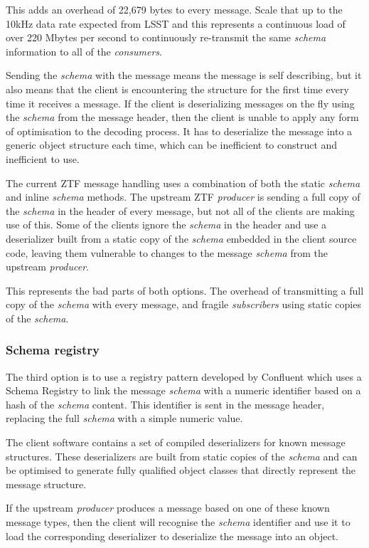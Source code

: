 \documentclass{article}
\newcommand{\kfconsumers} {\textit{consumers}\xspace}
\newcommand{\kfproducer} {\textit{producer}\xspace}
\newcommand{\kfsubscribers} {\textit{subscribers}\xspace}
\newcommand{\confluent} {Confluent\xspace}
\newcommand{\avschema} {\textit{schema}\xspace}
\newcommand{\conschemareg} {registry\xspace}
\newcommand{\conschemaregistry} {Schema Registry\xspace}
\newcommand{\deserz}    {deserialize\xspace}
\newcommand{\deserzer}  {deserializer\xspace}
\newcommand{\deserzers} {deserializers\xspace}
\newcommand{\deserzing} {deserializing\xspace}
\begin{document}
This adds an overhead of 22,679 bytes to every message. Scale that up to the 10kHz data rate expected from LSST and this represents a continuous load of over 220 Mbytes per second to continuously re-transmit the same \avschema information to all of the \kfconsumers.

Sending the \avschema with the message means the message is self describing, but it also means that the client is encountering the structure for the first time every time it receives a message. If the client is \deserzing messages on the fly using the \avschema from the message header, then the client is unable to apply any form of optimisation to the decoding process. It has to \deserz the message into a generic object structure each time, which can be inefficient to construct and inefficient to use.

The current ZTF message handling uses a combination of both the static \avschema and inline \avschema methods.
The upstream ZTF \kfproducer is sending a full copy of the \avschema in the header of every message, but not all of the clients are making use of this. 
Some of the clients ignore the \avschema in the header and use a \deserzer built from a static copy of the \avschema embedded in the client source code, leaving them vulnerable to changes to the message \avschema from the upstream \kfproducer.

This represents the bad parts of both options. The overhead of transmitting a full copy of the \avschema with every message, and fragile \kfsubscribers using static copies of the \avschema.

\subsubsection{Schema registry}
\label{avro-schema-registry}

The third option is to use a \conschemareg pattern developed by \confluent which uses a \conschemaregistry to link the message \avschema with a numeric identifier based on a hash of the \avschema content.
This identifier is sent in the message header, replacing the full \avschema with a simple numeric value.

The client software contains a set of compiled \deserzers for known message structures.
These \deserzers are built from static copies of the \avschema and can be optimised to generate fully qualified object classes that directly represent the message structure.

If the upstream \kfproducer produces a message based on one of these known message types, then the client will recognise the \avschema identifier and use it to load the corresponding \deserzer to \deserz the message into an object.
\end{document}
